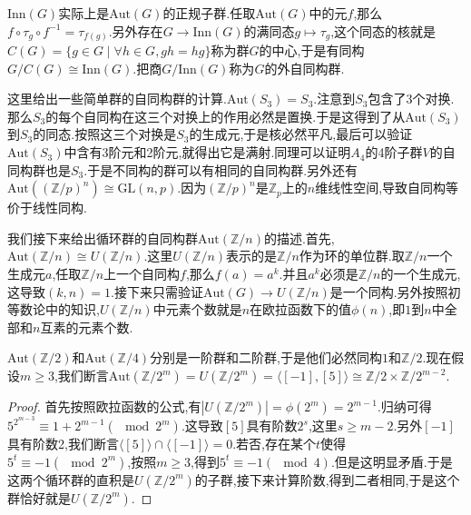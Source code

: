$\mathrm{Inn}(G)$实际上是$\mathrm{Aut}(G)$的正规子群.任取$\mathrm{Aut}(G)$中的元$f$,那么$f\circ\tau_g\circ f^{-1}=\tau_{f(g)}$.另外存在$G\to\mathrm{Inn}(G)$的满同态$g\mapsto\tau_g$,这个同态的核就是$C(G)=\{g\in G\mid\forall h\in G,gh=hg\}$称为群$G$的中心,于是有同构$G/C(G)\cong\mathrm{Inn}(G)$.把商$G/\mathrm{Inn}(G)$称为$G$的外自同构群.

这里给出一些简单群的自同构群的计算.$\mathrm{Aut}(S_3)=S_3$.注意到$S_3$包含了3个对换.那么$S_3$的每个自同构在这三个对换上的作用必然是置换.于是这得到了从$\mathrm{Aut}(S_3)$到$S_3$的同态.按照这三个对换是$S_3$的生成元,于是核必然平凡,最后可以验证$\mathrm{Aut}(S_3)$中含有3阶元和2阶元,就得出它是满射.同理可以证明$A_4$的4阶子群$V$的自同构群也是$S_3$.于是不同构的群可以有相同的自同构群.另外还有$\mathrm{Aut}((\mathbb{Z}/p)^n)\cong\mathrm{GL}(n,p)$.因为$(\mathbb{Z}/p)^n$是$\mathbb{Z}_p$上的$n$维线性空间,导致自同构等价于线性同构.

我们接下来给出循环群的自同构群$\mathrm{Aut}(\mathbb{Z}/n)$的描述.首先,$\mathrm{Aut}(\mathbb{Z}/n)\cong U(\mathbb{Z}/n)$.这里$U(\mathbb{Z}/n)$表示的是$\mathbb{Z}/n$作为环的单位群.取$\mathbb{Z}/n$一个生成元$a$,任取$\mathbb{Z}/n$上一个自同构$f$,那么$f(a)=a^k$.并且$a^k$必须是$\mathbb{Z}/n$的一个生成元,这导致$(k,n)=1$.接下来只需验证$\mathrm{Aut}(G)\to U(\mathbb{Z}/n)$是一个同构.另外按照初等数论中的知识,$U(\mathbb{Z}/n)$中元素个数就是$n$在欧拉函数下的值$\phi(n)$,即$1$到$n$中全部和$n$互素的元素个数.

$\mathrm{Aut}(\mathbb{Z}/2)$和$\mathrm{Aut}(\mathbb{Z}/4)$分别是一阶群和二阶群,于是他们必然同构$1$和$\mathbb{Z}/2$.现在假设$m\ge3$,我们断言$\mathrm{Aut}(\mathbb{Z}/2^m)=U(\mathbb{Z}/2^m)=\langle[-1],[5]\rangle\cong \mathbb{Z}/2\times \mathbb{Z}/2^{m-2}$.
\begin{proof}
	
	首先按照欧拉函数的公式,有$|U(\mathbb{Z}/2^m)|=\phi(2^m)=2^{m-1}$.归纳可得$5^{2^{m-3}}\equiv1+2^{m-1}(\mod 2^m)$.这导致$[5]$具有阶数$2^s$,这里$s\ge m-2$.另外$[-1]$具有阶数2,我们断言$\langle[5]\rangle\cap\langle[-1]\rangle={0}$.若否,存在某个$t$使得$5^t\equiv -1(\mod 2^m)$,按照$m\ge3$,得到$5^t\equiv -1(\mod 4)$.但是这明显矛盾.于是这两个循环群的直积是$U(\mathbb{Z}/2^m)$的子群,接下来计算阶数,得到二者相同,于是这个群恰好就是$U(\mathbb{Z}/2^m)$.
\end{proof}


